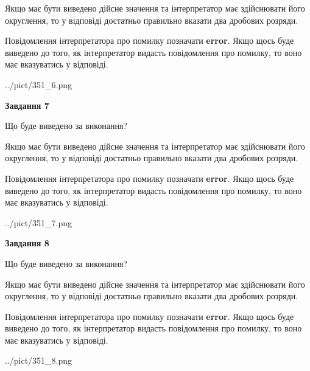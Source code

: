 \documentclass[12pt, ukrainian]{article}
\begin{document}
{\begin {Large}
Якщо має бути виведено дійсне значення та інтерпретатор має здійснювати його округлення, 
то у відповіді достатньо правильно вказати два дробових розряди.

Повідомлення інтерпретатора про помилку позначати \textbf{error}.
Якщо щось буде виведено до того, як інтерпретатор видасть повідомлення про помилку, 
то воно має вказуватись у відповіді. \par

\begin{center}
	{../pict/351_6.png}
\end{center}
\newpage

{\begin {center}\textbf{Завдання 7}\end {center}}\par
Що буде виведено за виконання? \par

Якщо має бути виведено дійсне значення та інтерпретатор має здійснювати його округлення, 
то у відповіді достатньо правильно вказати два дробових розряди.

Повідомлення інтерпретатора про помилку позначати \textbf{error}.
Якщо щось буде виведено до того, як інтерпретатор видасть повідомлення про помилку, 
то воно має вказуватись у відповіді. \par

\begin{center}
	{../pict/351_7.png}
\end{center}
\newpage

{\begin {center}\textbf{Завдання 8}\end {center}}\par
Що буде виведено за виконання? \par

Якщо має бути виведено дійсне значення та інтерпретатор має здійснювати його округлення, 
то у відповіді достатньо правильно вказати два дробових розряди.

Повідомлення інтерпретатора про помилку позначати \textbf{error}.
Якщо щось буде виведено до того, як інтерпретатор видасть повідомлення про помилку, 
то воно має вказуватись у відповіді. \par

\begin{center}
	{../pict/351_8.png}
\end{center}
\newpage


\end{Large}}
\end{document}
